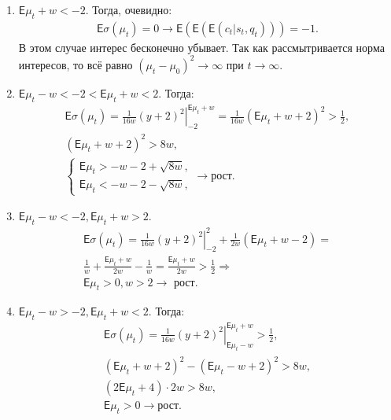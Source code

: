 \documentclass[12pt, twoside]{article}
\begin{document}
\begin{enumerate}
  \item $\mathsf{E} \mu_t + w < -2$. Тогда, очевидно:
    \begin{gather*}
      \mathsf{E}\sigma(\mu_t) = 0 \to \mathsf{E}(\mathsf{E}(\mathsf{E}(c_t|s_t, q_t))) = -1.
    \end{gather*}
    В этом случае интерес бесконечно убывает. 
    Так как рассмытривается норма интересов, то всё равно $(\mu_t -\mu_0)^2 \to \infty$ при $t\to\infty$. 

  \item $\mathsf{E}\mu_t - w < -2 < \mathsf{E}\mu_t + w < 2$. Тогда:
    \begin{gather*}
      \mathsf{E}\sigma(\mu_t) = \left. \frac{1}{16w} (y+2)^2 \right|_{-2}^{\mathsf{E}\mu_t + w} = 
        \frac{1}{16w} (\mathsf{E}\mu_t + w + 2)^2 > \frac{1}{2}, \\
        (\mathsf{E}\mu_t + w + 2)^2 > 8w, \\
    \begin{cases}
      \mathsf{E}\mu_t > -w - 2 + \sqrt{8w}, \\
      \mathsf{E}\mu_t < -w - 2 - \sqrt{8w}, 
    \end{cases} \to \text{рост}.
    \end{gather*}

  \item $\mathsf{E}\mu_t - w < -2, \mathsf{E}\mu_t + w > 2$. 
    \begin{gather*}
      \mathsf{E}\sigma(\mu_t) = \left. \frac{1}{16 w} (y+2)^2 \right|_{-2}^{2} + \frac{1}{2 w}(\mathsf{E}\mu_t + w -2) = \\
        \frac{1}{w} + \frac{\mathsf{E}\mu_t+w}{2w} - \frac{1}{w} = \frac{\mathsf{E}\mu_t + w}{2 w} > \frac{1}{2} \Rightarrow \\
        \mathsf{E}\mu_t > 0, w > 2 \to \text{ рост}.
    \end{gather*}
  
  \item $\mathsf{E}\mu_t - w > -2, \mathsf{E}\mu_t + w < 2$. Тогда:
    \begin{gather*}
      \mathsf{E}\sigma(\mu_t) = \left. \frac{1}{16 w} (y+2)^2 \right|_{\mathsf{E}\mu_t - w}^{\mathsf{E}\mu_t + w} > \frac{1}{2},\\
        (\mathsf{E}\mu_t + w + 2)^2 - (\mathsf{E}\mu_t - w + 2)^2 > 8w,\\
        (2 \mathsf{E}\mu_t + 4) \cdot 2w > 8w,\\
        \mathsf{E} \mu_t  > 0 \to \text{рост}. 
    \end{gather*}
  

\end{enumerate}
\end{document}
